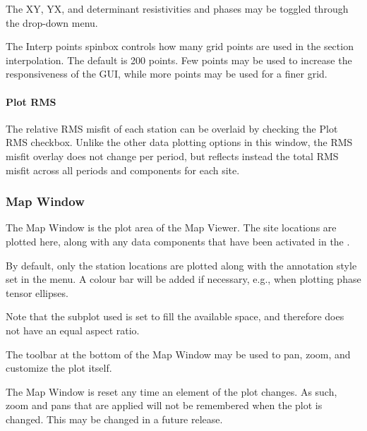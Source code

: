 \documentclass[letterpaper,10pt,english]{sphinxmanual}
\begin{document}
The XY, YX, and determinant resistivities and phases may be toggled through the drop-down menu.

The Interp points spinbox controls how many grid points are used in the section interpolation. The default is 200 points. Few points may be used to increase the responsiveness of the GUI, while more points may be used for a finer grid.


\paragraph{Plot RMS}
\label{\detokenize{content/data_plot/map_viewer:plot-rms}}
The relative RMS misfit of each station can be overlaid by checking the Plot RMS checkbox. Unlike the other data plotting options in this window, the RMS misfit overlay does not change per period, but reflects instead the total RMS misfit across all periods and components for each site.


\subsubsection{Map Window}
\label{\detokenize{content/data_plot/map_viewer:map-window}}\label{\detokenize{content/data_plot/map_viewer:id2}}
\begin{figure}[htbp]
\centering

\noindent{}
\end{figure}

The Map Window is the plot area of the Map Viewer. The site locations are plotted here, along with any data components that have been activated in the {\hyperref[\detokenize{content/data_plot/map_viewer:control-dock}]{}}.

By default, only the station locations are plotted along with the annotation style set in the {\hyperref[\detokenize{content/data_plot/map_viewer:point-options}]{}} menu. A colour bar will be added if necessary, e.g., when plotting phase tensor ellipses.

Note that the subplot used is set to fill the available space, and therefore does not have an equal aspect ratio.

The toolbar at the bottom of the Map Window may be used to pan, zoom, and customize the plot itself.

The Map Window is reset any time an element of the plot changes. As such, zoom and pans that are applied will not be remembered when the plot is changed. This may be changed in a future release.
\end{document}

